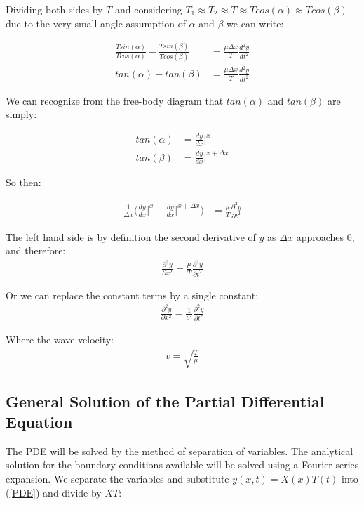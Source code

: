 \documentclass[%
 reprint,
 amsmath,amssymb,
 aps,
]{revtex4-1}
\begin{document}
Dividing both sides by $T$ and considering $T_1 \approx T_2 \approx T \approx Tcos(\alpha) \approx Tcos(\beta)$ due to the very small angle assumption of $\alpha$ and $\beta$ we can write:

\begin{align}
\frac{Tsin(\alpha)}{Tcos(\alpha)} - \frac{Tsin(\beta)}{Tcos(\beta)} &=  \frac{\mu \Delta x}{T} \frac{d^2y}{dt^2}\\
tan(\alpha) - tan(\beta) &=  \frac{\mu \Delta x}{T} \frac{d^2y}{dt^2}
\end{align}

We can recognize from the free-body diagram that $tan(\alpha)$  and $tan(\beta)$ are simply:

\begin{align}
tan(\alpha) &= \frac{dy}{dx} \Big|^x\\
tan(\beta) &= \frac{dy}{dx} \Big|^{x+\Delta x}
\end{align}

So then:

\begin{align}
 \frac{1}{\Delta x} \Big( \frac{dy}{dx} \Big|^x - \frac{dy}{dx} \Big|^{x+\Delta x}\Big) &=  \frac{\mu}{T} \frac{\partial^2 y}{\partial t^2}
\end{align}

The left hand side is by definition the second derivative of $y$ as $\Delta x$ approaches $0$, and therefore:
\begin{align}
\frac{\partial^2 y}{\partial x^2} = \frac{\mu}{T} \frac{\partial^2y}{\partial t^2}
\end{align}

Or we can replace the constant terms by a single constant:
\begin{align} \label{PDE}
\frac{\partial^2 y}{\partial x^2} = \frac{1}{v^2} \frac{\partial^2y}{\partial t^2}   
\end{align}

Where the wave velocity:
\begin{align}
v = \sqrt{\frac{T}{\mu}}
\end{align}

\subsection{\label{sec:level1}General Solution of the Partial Differential Equation}
The PDE will be solved by the method of separation of variables. The analytical solution for the boundary conditions available will be solved using a Fourier series expansion. We separate the variables and substitute $y(x,t) = X(x)T(t)$ into (\ref{PDE})  and divide by $XT$:
\end{document}
